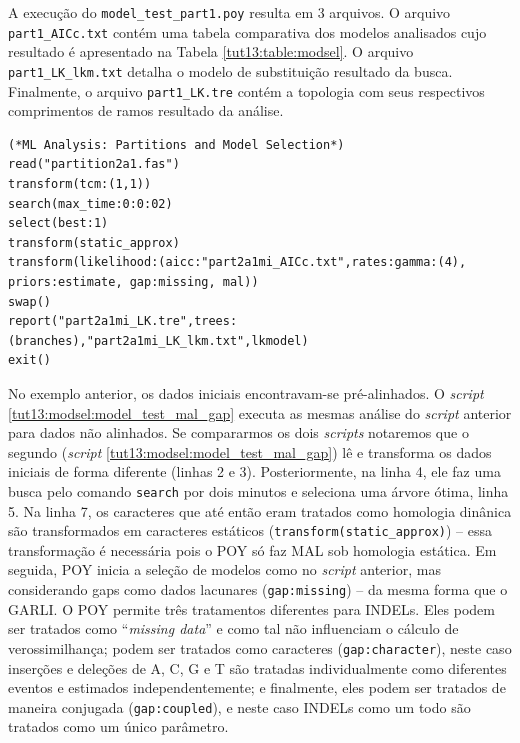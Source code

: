 \begin{refsection}
A execução do \texttt{model\_test\_part1.poy} resulta em 3 arquivos. O arquivo \texttt{part1\_AICc.txt} contém uma tabela comparativa dos modelos analisados cujo resultado é apresentado na Tabela \ref{tut13:table:modsel}. O arquivo \texttt{part1\_LK\_lkm.txt} detalha o modelo de substituição resultado da busca. Finalmente, o arquivo \texttt{part1\_LK.tre} contém a topologia com seus respectivos comprimentos de ramos resultado da análise.

\scriptsize
\begin{lstlisting}[caption= conteúdo do arquivo \texttt{model\_test\_part2a1mi.poy}.,label=tut13:modsel:model_test_mal_gap]
(*ML Analysis: Partitions and Model Selection*)
read("partition2a1.fas")
transform(tcm:(1,1))
search(max_time:0:0:02)
select(best:1)
transform(static_approx)
transform(likelihood:(aicc:"part2a1mi_AICc.txt",rates:gamma:(4), priors:estimate, gap:missing, mal))
swap()
report("part2a1mi_LK.tre",trees:(branches),"part2a1mi_LK_lkm.txt",lkmodel)
exit()
\end{lstlisting}
\normalsize

No exemplo anterior, os dados iniciais encontravam-se pré-alinhados. O \textit{script} \ref{tut13:modsel:model_test_mal_gap} executa as mesmas análise do \textit{script} anterior para dados não alinhados. Se compararmos os dois \textit{scripts} notaremos que o segundo (\textit{script} \ref{tut13:modsel:model_test_mal_gap}) lê e transforma os dados iniciais de forma diferente (linhas 2 e 3). Posteriormente, na linha 4, ele faz uma busca pelo comando \texttt{search} por dois minutos e seleciona uma árvore ótima, linha 5. Na linha 7, os caracteres que até então eram tratados como homologia dinânica são transformados em caracteres estáticos (\texttt{transform(static\_approx)}) -- essa transformação é necessária pois o POY só faz MAL sob homologia estática. Em seguida, POY inicia a seleção de modelos como no \textit{script} anterior, mas considerando gaps como dados lacunares (\texttt{gap:missing}) -- da mesma forma que o GARLI. O POY permite três tratamentos diferentes para INDELs. Eles podem ser tratados como ``\textit{missing data}'' e como tal não influenciam o cálculo de verossimilhança; podem ser tratados como caracteres (\texttt{gap:character}), neste caso inserções e deleções de A, C, G e T são tratadas individualmente como diferentes eventos e estimados independentemente; e finalmente, eles podem ser tratados de maneira conjugada (\texttt{gap:coupled}), e neste caso INDELs como um todo são tratados como um único parâmetro.\\



\end{refsection}
